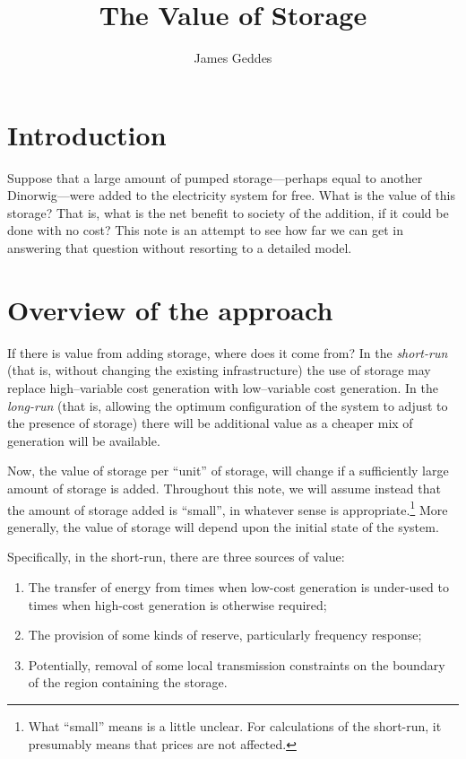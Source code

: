 \documentclass[12pt, a4paper]{article}
\title{The Value of Storage}
\author{James Geddes}
\begin{document}
\maketitle

\section{Introduction}
Suppose that a large amount of pumped storage—perhaps equal to another
Dinorwig—were added to the electricity system for free. What is the
value of this storage? That is, what is the net benefit to society of
the addition, if it could be done with no cost? This note is an
attempt to see how far we can get in answering that question without
resorting to a detailed model.


\section{Overview of the approach}

If there is value from adding storage, where does it come from? In the
\emph{short-run} (that is, without changing the existing
infrastructure) the use of storage may replace high--variable cost
generation with low--variable cost generation. In the \emph{long-run}
(that is, allowing the optimum configuration of the system to adjust
to the presence of storage) there will be additional value as a
cheaper mix of generation will be available.

Now, the value of storage per ``unit'' of storage, will change if a
sufficiently large amount of storage is added. Throughout this note,
we will assume instead that the amount of storage added is ``small'',
in whatever sense is appropriate.\footnote{What ``small'' means is a
  little unclear. For calculations of the short-run, it presumably
  means that prices are not affected.} More generally, the value of
storage will depend upon the initial state of the system.

Specifically, in the short-run, there are three sources of value:
\begin{enumerate}
\item The transfer of energy from times when low-cost generation is
  under-used to times when high-cost generation is otherwise required;
\item The provision of some kinds of reserve, particularly frequency
  response;
\item Potentially, removal of some local transmission constraints on
  the boundary of the region containing the storage. 
\end{enumerate}
\end{document}
